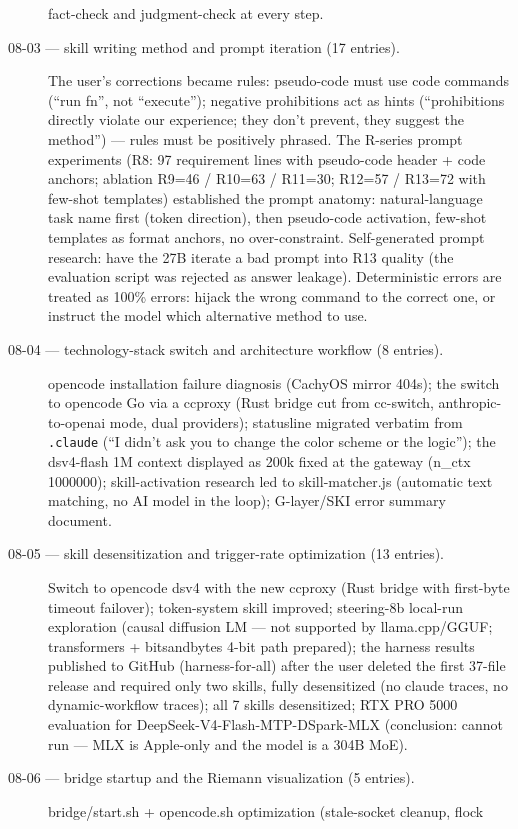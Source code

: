 \documentclass[sigplan,10pt,anonymous,review]{acmart}
\begin{document}
\begin{description}
fact-check and judgment-check at every step.
\item[08-03 --- skill writing method and prompt iteration (17 entries).]
The user's corrections became rules: pseudo-code must use code commands
(``run fn'', not ``execute''); negative prohibitions act as hints
(``prohibitions directly violate our experience; they don't prevent, they
suggest the method'') --- rules must be positively phrased. The R-series
prompt experiments (R8: 97 requirement lines with pseudo-code header +
code anchors; ablation R9=46 / R10=63 / R11=30; R12=57 / R13=72 with
few-shot templates) established the prompt anatomy: natural-language task
name first (token direction), then pseudo-code activation, few-shot
templates as format anchors, no over-constraint. Self-generated prompt
research: have the 27B iterate a bad prompt into R13 quality (the
evaluation script was rejected as answer leakage). Deterministic errors
are treated as 100\% errors: hijack the wrong command to the correct one,
or instruct the model which alternative method to use.
\item[08-04 --- technology-stack switch and architecture workflow
(8 entries).] opencode installation failure diagnosis (CachyOS mirror
404s); the switch to opencode Go via a ccproxy (Rust bridge cut from
cc-switch, anthropic-to-openai mode, dual providers); statusline migrated
verbatim from \texttt{.claude} (``I didn't ask you to change the color
scheme or the logic''); the dsv4-flash 1M context displayed as 200k
fixed at the gateway (n\_ctx 1000000); skill-activation research led to
skill-matcher.js (automatic text matching, no AI model in the loop);
G-layer/SKI error summary document.
\item[08-05 --- skill desensitization and trigger-rate optimization
(13 entries).] Switch to opencode dsv4 with the new ccproxy (Rust bridge
with first-byte timeout failover); token-system skill improved; steering-8b
local-run exploration (causal diffusion LM --- not supported by
llama.cpp/GGUF; transformers + bitsandbytes 4-bit path prepared); the
harness results published to GitHub (harness-for-all) after the user
deleted the first 37-file release and required only two skills, fully
desensitized (no claude traces, no dynamic-workflow traces); all 7 skills
desensitized; RTX PRO 5000 evaluation for DeepSeek-V4-Flash-MTP-DSpark-MLX
(conclusion: cannot run --- MLX is Apple-only and the model is a 304B
MoE).
\item[08-06 --- bridge startup and the Riemann visualization (5 entries).]
bridge/start.sh + opencode.sh optimization (stale-socket cleanup, flock

\end{description}
\end{document}

